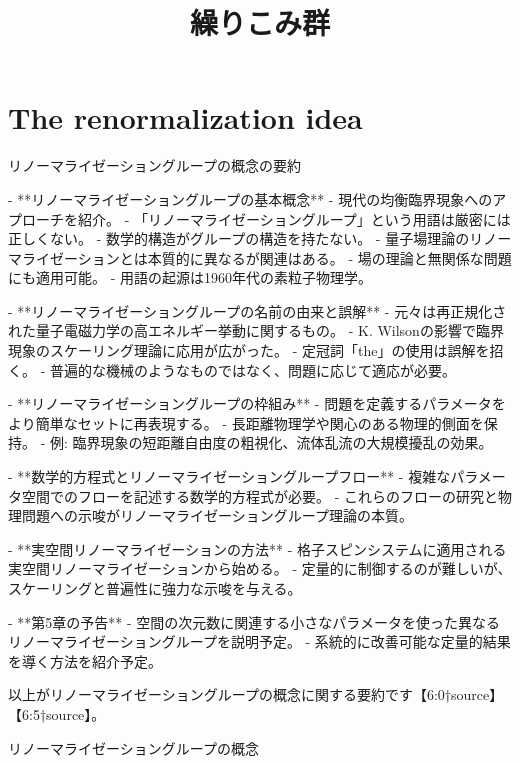 \documentclass[a4paper,10pt]{ltjsarticle} %
\begin{document}
\title{繰りこみ群
  
}
\maketitle
\section{The renormalization idea}
リノーマライゼーショングループの概念の要約

- **リノーマライゼーショングループの基本概念**
  - 現代の均衡臨界現象へのアプローチを紹介。
  - 「リノーマライゼーショングループ」という用語は厳密には正しくない。
  - 数学的構造がグループの構造を持たない。
  - 量子場理論のリノーマライゼーションとは本質的に異なるが関連はある。
  - 場の理論と無関係な問題にも適用可能。
  - 用語の起源は1960年代の素粒子物理学。

- **リノーマライゼーショングループの名前の由来と誤解**
  - 元々は再正規化された量子電磁力学の高エネルギー挙動に関するもの。
  - K. Wilsonの影響で臨界現象のスケーリング理論に応用が広がった。
  - 定冠詞「the」の使用は誤解を招く。
  - 普遍的な機械のようなものではなく、問題に応じて適応が必要。

- **リノーマライゼーショングループの枠組み**
  - 問題を定義するパラメータをより簡単なセットに再表現する。
  - 長距離物理学や関心のある物理的側面を保持。
  - 例: 臨界現象の短距離自由度の粗視化、流体乱流の大規模擾乱の効果。

- **数学的方程式とリノーマライゼーショングループフロー**
  - 複雑なパラメータ空間でのフローを記述する数学的方程式が必要。
  - これらのフローの研究と物理問題への示唆がリノーマライゼーショングループ理論の本質。

- **実空間リノーマライゼーションの方法**
  - 格子スピンシステムに適用される実空間リノーマライゼーションから始める。
  - 定量的に制御するのが難しいが、スケーリングと普遍性に強力な示唆を与える。

- **第5章の予告**
  - 空間の次元数に関連する小さなパラメータを使った異なるリノーマライゼーショングループを説明予定。
  - 系統的に改善可能な定量的結果を導く方法を紹介予定。

以上がリノーマライゼーショングループの概念に関する要約です【6:0†source】【6:5†source】。


リノーマライゼーショングループの概念
\end{document}
